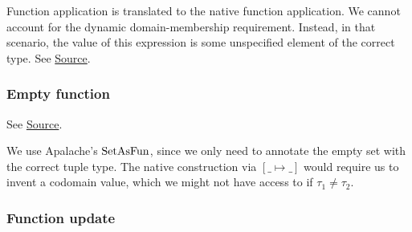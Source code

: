 \begin{mathpar}
\end{mathpar}

Function application is translated to the \tlap{} native function application.
We cannot account for the dynamic domain-membership requirement. Instead, in
that scenario, the value of this expression is some unspecified element of the
correct type. See
\href{https://github.com/saltiniroberto/ssf/blob/7ea6e18093d9da3154b4e396dd435549f687e6b9/high_level/common/pythonic_code_generic.py#L104-L106}{Source}.



\subsubsection{ Empty function}


\begin{mathpar}
\end{mathpar}

See
\href{https://github.com/saltiniroberto/ssf/blob/7ea6e18093d9da3154b4e396dd435549f687e6b9/high_level/common/pythonic_code_generic.py#L109-L110}{Source}.

We use Apalache's $\SetAsFun$, since we only need to annotate the empty set
with the correct tuple type. The native construction via $[ \_ \mapsto \_]$
would require us to invent a codomain value, which we might not have access to
if $\tau_1 \ne \tau_2$.

\subsubsection{ Function update}



